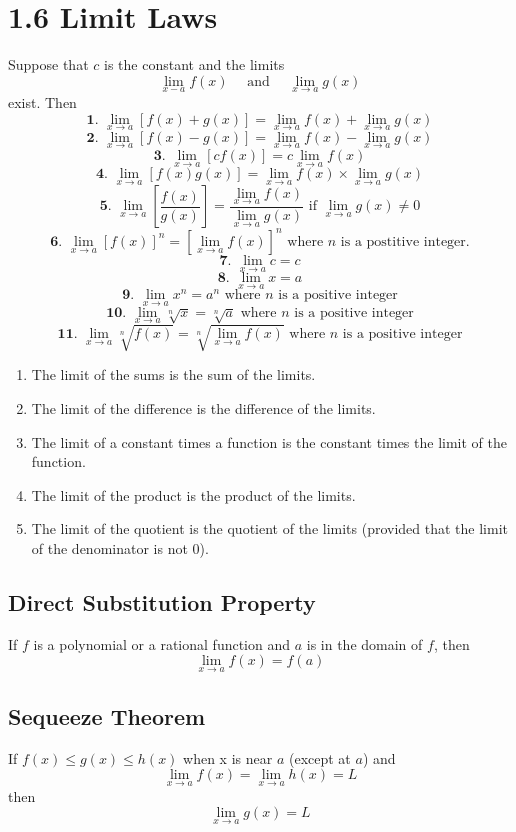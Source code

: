 %
%

\section*{1.6 Limit Laws}

Suppose that \(c\) is the constant and the limits 
$$\lim_{x-a}f(x) \quad \text{ and } \quad \lim_{x \to a}g(x)$$
exist. Then
$$\textbf{1. }\lim_{x \to a}[f(x)+g(x)]=\lim_{x \to a}f(x) + \lim_{x \to a}g(x)$$
$$\textbf{2. }\lim_{x \to a}[f(x)-g(x)]=\lim_{x \to a}f(x) - \lim_{x \to a}g(x)$$
$$\textbf{3. }\lim_{x \to a}[cf(x)]=c\lim_{x \to a}f(x)$$
$$\textbf{4. }\lim_{x \to a}[f(x)g(x)]=\lim_{x \to a}f(x) \times \lim_{x \to a}g(x)$$
$$\textbf{5. }\lim_{x \to a}[\frac{f(x)}{g(x)}]=\frac{\lim_{x \to a}f(x)}{\lim_{x \to a}g(x)} \text{ if } \lim_{x \to a}g(x) \neq 0 $$
$$\textbf{6. }\lim_{x \to a}[f(x)]^n=[\lim_{x \to a}f(x)]^n \text{ where } n \text{ is a postitive integer.}$$
$$\textbf{7. }\lim_{x \to a}c=c$$
$$\textbf{8. }\lim_{x \to a}x=a$$
$$\textbf{9. }\lim_{x \to a}x^n=a^n \text{ where } n \text{ is a positive integer}$$
$$\textbf{10. }\lim_{x \to a}\sqrt[n]x=\sqrt[n]a \text{ where } n \text{ is a positive integer}$$
$$\textbf{11. }\lim_{x \to a}\sqrt[n]{f(x)}=\sqrt[n]{\lim_{x \to a}f(x)} \text{ where } n \text{ is a positive integer}$$

\begin{enumerate}
    \item The limit of the sums is the sum of the limits.
    \item The limit of the difference is the difference of the limits.
    \item The limit of a constant times a function is the constant times the limit of the function.
    \item The limit of the product is the product of the limits.
    \item The limit of the quotient is the quotient of the limits (provided that the limit of the denominator is not 0).
\end{enumerate}

\subsection*{Direct Substitution Property}

If \(f\) is a polynomial or a rational function and \(a\) is in the domain of \(f\), then 
$$\lim_{x \to a}f(x)=f(a)$$

\subsection*{Sequeeze Theorem}

If \(f(x) \leq g(x) \leq h(x)\) when x is near \(a\) (except at \(a\)) and 
$$\lim_{x \to a}f(x)=\lim_{x \to a}h(x) = L$$
then
$$\lim_{x \to a}g(x) = L$$
